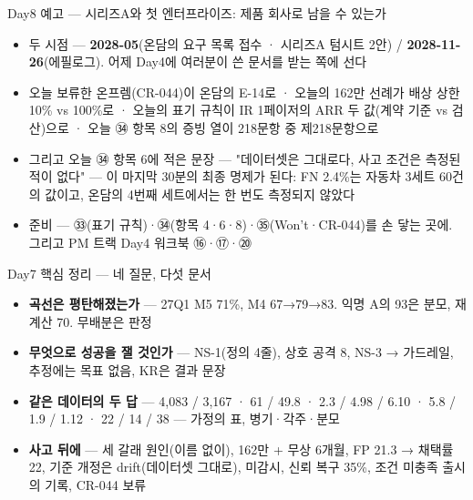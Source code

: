 \begin{frame}{Day8 예고 — 시리즈A와 첫 엔터프라이즈: 제품 회사로 남을 수 있는가}
\begin{itemize}
\item 두 시점 — \textbf{2028-05}(온담의 요구 목록 접수 · 시리즈A 텀시트 2안) / \textbf{2028-11-26}(에필로그). 어제 Day4에 여러분이 쓴 문서를 받는 쪽에 선다
\item 오늘 보류한 온프렘(CR-044)이 온담의 E-14로 · 오늘의 162만 선례가 배상 상한 10\% vs 100\%로 · 오늘의 표기 규칙이 IR 1페이저의 ARR 두 값(계약 기준 vs 검산)으로 · 오늘 ㉞ 항목 8의 증빙 열이 218문항 중 제218문항으로
\item 그리고 오늘 ㉞ 항목 6에 적은 문장 — "데이터셋은 그대로다, 사고 조건은 측정된 적이 없다" — 이 마지막 30분의 최종 명제가 된다: FN 2.4\%는 자동차 3세트 60건의 값이고, 온담의 4번째 세트에서는 한 번도 측정되지 않았다
\item 준비 — ㉝(표기 규칙)·㉞(항목 4·6·8)·㉟(Won't·CR-044)를 손 닿는 곳에. 그리고 PM 트랙 Day4 워크북 ⑯·⑰·⑳
\end{itemize}
\end{frame}

\begin{frame}{Day7 핵심 정리 — 네 질문, 다섯 문서}
\begin{itemize}
\item \textbf{곡선은 평탄해졌는가} — 27Q1 M5 71\%, M4 67→79→83. 익명 A의 93은 분모, 재계산 70. 무배분은 판정
\item \textbf{무엇으로 성공을 잴 것인가} — NS-1(정의 4줄), 상호 공격 8, NS-3 → 가드레일, 추정에는 목표 없음, KR은 결과 문장
\item \textbf{같은 데이터의 두 답} — 4,083 / 3,167 · 61 / 49.8 · 2.3 / 4.98 / 6.10 · 5.8 / 1.9 / 1.12 · 22 / 14 / 38 — 가정의 표, 병기·각주·분모
\item \textbf{사고 뒤에} — 세 갈래 원인(이름 없이), 162만 + 무상 6개월, FP 21.3 → 채택률 22, 기준 개정은 drift(데이터셋 그대로), 미감시, 신뢰 복구 35\%, 조건 미충족 출시의 기록, CR-044 보류
\end{itemize}
\end{frame}
